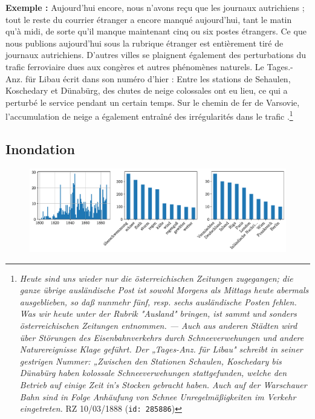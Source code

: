 \documentclass[a4paper,twoside,12pt]{article}
\begin{document}
\noindent \textbf{Exemple :} \og Aujourd'hui encore, nous n'avons reçu que les journaux autrichiens ; tout le reste du courrier étranger a encore manqué aujourd'hui, tant le matin qu'à midi, de sorte qu'il manque maintenant cinq ou six postes étrangers. Ce que nous publions aujourd'hui sous la rubrique \og étranger \fg{} est entièrement tiré de journaux autrichiens. D'autres villes se plaignent également des perturbations du trafic ferroviaire dues aux congères et autres phénomènes naturels. Le \og Tages.-Anz. für Libau \fg{} écrit dans son numéro d'hier : \og Entre les stations de Sehaulen, Koschedary et Dünabürg, des chutes de neige colossales ont eu lieu, ce qui a perturbé le service pendant un certain temps. Sur le chemin de fer de Varsovie, l'accumulation de neige a également entraîné des irrégularités dans le trafic \fg{}.\footnote{\textit{Heute sind uns wieder nur die österreichischen Zeitungen zugegangen; die ganze übrige ausländische Post ist sowohl Morgens als Mittags heute abermals ausgeblieben, so daß nunmehr fünf, resp. sechs ausländische Posten fehlen. Was wir heute unter der Rubrik "Ausland" bringen, ist sammt und sonders österreichischen Zeitungen entnommen. — Auch aus anderen Städten wird über Störungen des Eisenbahnverkehrs durch Schneeverwehungen und andere Naturereignisse Klage geführt. Der „Tages-Anz. für Libau" schreibt in seiner gestrigen Nummer: „Zwischen den Stationen Schaulen, Koschedary bis Dünabürg haben kolossale Schneeverwehungen stattgefunden, welche den Betrieb auf einige Zeit in's Stocken gebracht haben. Auch auf der Warschauer Bahn sind in Folge Anhäufung von Schnee Unregelmäßigkeiten im Verkehr eingetreten.} RZ 10/03/1888 (\texttt{id: 285886})}


\subsection*{Inondation} \label{topic9_inondation}

\begin{figure}[H]
\centering
\includegraphics[width=\textwidth]{images/topic_charts_9.pdf}
\end{figure}
\end{document}
